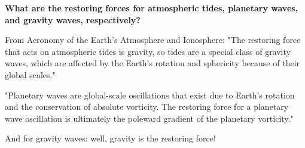 \textbf{What are the restoring forces for atmospheric tides, planetary
waves, and gravity waves, respectively?}

From Aeronomy of the Earth's Atmosphere and Ionosphere:
"The restoring force that acts on atmospheric tides is gravity, so tides
are a special class of gravity waves, which are affected by the Earth's
rotation and sphericity because of their global scales."

"Planetary waves are global-scale oscillations that exist due to Earth's
rotation and the conservation of absolute vorticity. The restoring force
for a planetary wave oscillation is ultimately the poleward gradient of
the planetary vorticity."

And for gravity waves: well, gravity is the restoring force!


